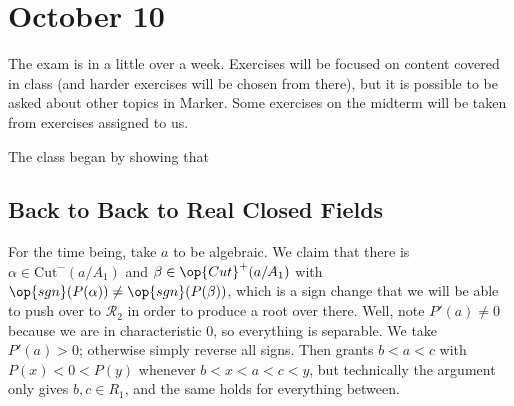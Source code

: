 \documentclass[../notes.tex]{subfiles}
\begin{document}
\section{October 10}

The exam is in a little over a week. Exercises will be focused on content covered in class (and harder exercises will be chosen from there), but it is possible to be asked about other topics in Marker. Some exercises on the midterm will be taken from exercises assigned to us.

The class began by showing that 

\subsection{Back to Back to Real Closed Fields}
For the time being, take $a$ to be algebraic. We claim that there is $\alpha\in\mathrm{Cut}^-(a/A_1)$ and $\beta\in\op{Cut}^+(a/A_1)$ with $\op{sgn}(P(\alpha))\ne\op{sgn}(P(\beta))$, which is a sign change that we will be able to push over to $\mathcal R_2$ in order to produce a root over there. Well, note $P'(a)\ne0$ because we are in characteristic $0$, so everything is separable. We take $P'(a)>0$; otherwise simply reverse all signs. Then  grants $b<a<c$ with $P(x)<0<P(y)$ whenever $b<x<a<c<y$, but technically the argument only gives $b,c\in R_1$, and the same holds for everything between.
\end{document}
